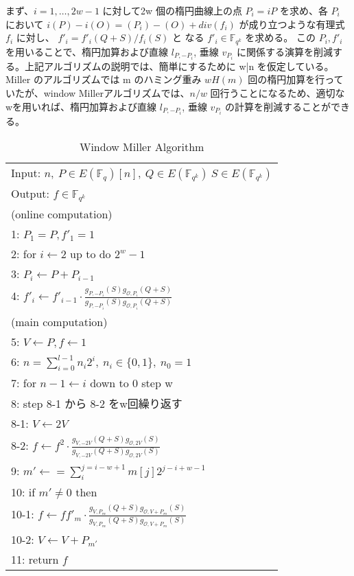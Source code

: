 まず、$i=1,\ldots,2w-1$ に対して2w 個の楕円曲線上の点 $P_i = iP$ を求め、各 $P_i$ において
$i(P) − i(O) = (P _i) − (O) + div(f _i)$ が成り立つような有理式 $f _i$ に対し、
$f' _i  = f' _i(Q + S) /f _i(S)$ と
なる $f' _i ∈ \mathbb{F}_{q^k}$ を求める。
この $P_i, f' _i$ を用いることで、楕円加算および直線 $l _{P, -P_i}$, 垂線 $v _{P_i}$
に関係する演算を削減する。上記アルゴリズムの説明では、簡単にするために w|n を仮定している。
 Miller のアルゴリズムでは m のハミング重み $wH (m)$ 回の楕円加算を行っていたが、window Millerアルゴリズムでは、$n/w$ 回行うことになるため、適切なwを用いれば、楕円加算および直線 $l _{P, -P_i}$, 垂線 $v _{P_i}$ の計算を削減することができる。
\par

\begin{table}[htbp]
 \begin{center}
  \begin{tabular}{|l|}
     \hline
     Input: $n, \ P \in E(\mathbb{F}_q)[n], \ Q \in E(\mathbb{F}_{q^k}) \ S \in E(\mathbb{F}_{q^k})$ \\
     Output: $f \in \mathbb{F}_{q^k}$  \\
     \hline
     (online computation) \\
     1: \quad $P_1 = P, f'_1=1 $\\
     2: \quad for $i \gets 2$ up to do $2^w -1$\\
     3: \quad \quad $P_i \gets P + P_{i-1} $\\
     4: \quad \quad $f'_i \gets f'_{i-1} \cdot \frac{g_{P,-P_i}(S)g_{\mathcal{O},P_i}(Q+S)}{g_{P,-P_i}(S)g_{\mathcal{O},P_i}(Q+S)}$\\

     (main computation) \\
     5: \quad $V \gets P, f \gets 1 $\\
     6: \quad $n=\sum^{l - 1}_{i=0} n_i 2^i, \ n_i \in \{0,1\},\ n_0 = 1$\\

     7: \quad for $ n-1 \gets i$ down to 0 step w\\
     8: \quad step 8-1 から 8-2 をw回繰り返す\\
     8-1: \quad\quad $V \gets 2V $\\
     8-2: \quad \quad $f \gets f^2 \cdot \frac{g_{V,-2V}(Q+S)g_{\mathcal{O},2V}(S)}{g_{V,-2V}(Q+S)g_{\mathcal{O},2V}(S)}$\\

     9: \quad $m' \gets =\sum^{j=i-w+1}_{i} m[j]2^{j-i+w-1} $\\
     10: \quad if $m' \neq 0$ then\\
     10-1: \quad \quad $f \gets ff'_m \cdot \frac{g_{V,P_m}(Q+S)g_{\mathcal{O},V+P_m}(S)}{g_{V,P_m}(Q+S)g_{\mathcal{O},V+P_m}(S)}$ \\
     10-2: \quad \quad $V \gets V + P_{m'} $\\
     11: \quad return $f$\\
     \hline
   \end{tabular}
 \end{center}
 \caption{Window Miller Algorithm}
\end{table}
